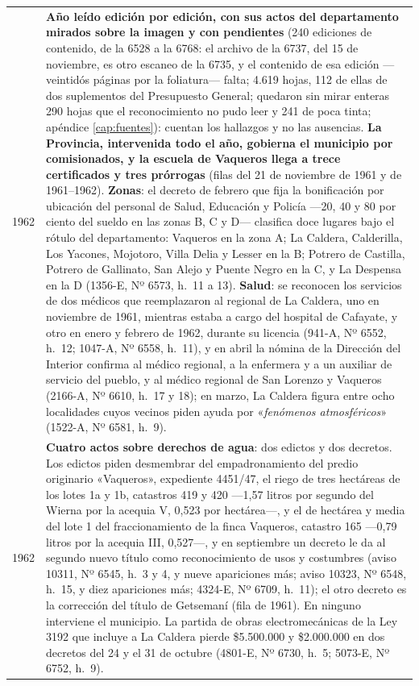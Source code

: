 \begin{longtable}{@{}p{2.7cm}p{10.3cm}@{}}
1962 & \textbf{Año leído edición por edición, con sus actos del departamento mirados sobre la imagen y con pendientes} (240 ediciones de contenido, de la 6528 a la 6768: el archivo de la 6737, del 15 de noviembre, es otro escaneo de la 6735, y el contenido de esa edición ---veintidós páginas por la foliatura--- falta; 4.619 hojas, 112 de ellas de dos suplementos del Presupuesto General; quedaron sin mirar enteras 290 hojas que el reconocimiento no pudo leer y 241 de poca tinta; apéndice \ref{cap:fuentes}): cuentan los hallazgos y no las ausencias. \textbf{La Provincia, intervenida todo el año, gobierna el municipio por comisionados, y la escuela de Vaqueros llega a trece certificados y tres prórrogas} (filas del 21 de noviembre de 1961 y de 1961--1962). \textbf{Zonas}: el decreto de febrero que fija la bonificación por ubicación del personal de Salud, Educación y Policía ---20, 40 y 80 por ciento del sueldo en las zonas B, C y D--- clasifica doce lugares bajo el rótulo del departamento: Vaqueros en la zona A; La Caldera, Calderilla, Los Yacones, Mojotoro, Villa Delia y Lesser en la B; Potrero de Castilla, Potrero de Gallinato, San Alejo y Puente Negro en la C, y La Despensa en la D (1356-E, Nº 6573, h.\ 11 a 13). \textbf{Salud}: se reconocen los servicios de dos médicos que reemplazaron al regional de La Caldera, uno en noviembre de 1961, mientras estaba a cargo del hospital de Cafayate, y otro en enero y febrero de 1962, durante su licencia (941-A, Nº 6552, h.\ 12; 1047-A, Nº 6558, h.\ 11), y en abril la nómina de la Dirección del Interior confirma al médico regional, a la enfermera y a un auxiliar de servicio del pueblo, y al médico regional de San Lorenzo y Vaqueros (2166-A, Nº 6610, h.\ 17 y 18); en marzo, La Caldera figura entre ocho localidades cuyos vecinos piden ayuda por «\textit{fenómenos atmosféricos}» (1522-A, Nº 6581, h.\ 9). \\
1962 & \textbf{Cuatro actos sobre derechos de agua}: dos edictos y dos decretos. Los edictos piden desmembrar del empadronamiento del predio originario «Vaqueros», expediente 4451/47, el riego de tres hectáreas de los lotes 1a y 1b, catastros 419 y 420 ---1,57 litros por segundo del Wierna por la acequia V, 0,523 por hectárea---, y el de hectárea y media del lote 1 del fraccionamiento de la finca Vaqueros, catastro 165 ---0,79 litros por la acequia III, 0,527---, y en septiembre un decreto le da al segundo nuevo título como reconocimiento de usos y costumbres (aviso 10311, Nº 6545, h.\ 3 y 4, y nueve apariciones más; aviso 10323, Nº 6548, h.\ 15, y diez apariciones más; 4324-E, Nº 6709, h.\ 11); el otro decreto es la corrección del título de Getsemaní (fila de 1961). En ninguno interviene el municipio. La partida de obras electromecánicas de la Ley 3192 que incluye a La Caldera pierde \$5.500.000 y \$2.000.000 en dos decretos del 24 y el 31 de octubre (4801-E, Nº 6730, h.\ 5; 5073-E, Nº 6752, h.\ 9). \\

\end{longtable}
